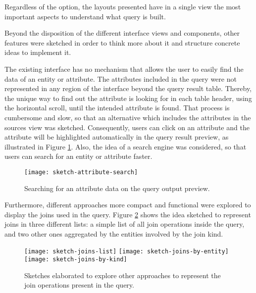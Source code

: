 Regardless of the option, the layouts presented have in a single view the most important aspects to understand what query is built.

Beyond the disposition of the different interface views and components, other features were sketched in order to think more about it and structure concrete ideas to implement it.

The existing interface has no mechanism that allows the user to easily find the data of an entity or attribute. The attributes included in the query were not represented in any region of the interface beyond the query result table. Thereby, the unique way to find out the attribute is looking for in each table header, using the horizontal scroll, until the intended attribute is found. That process is cumbersome and slow, so that an alternative which includes the attributes in the sources view was sketched. Consequently, users can click on an attribute and the attribute will be highlighted automatically in the query result preview, as illustrated in Figure \ref{fig:sketchAttributeSearch}. Also, the idea of a search engine was considered, so that users can search for an entity or attribute faster.

\begin{figure}[htbp]
	\centering
	\texttt{[image: sketch-attribute-search]}
	\caption{Searching for an attribute data on the query output preview.}
	\label{fig:sketchAttributeSearch}
\end{figure}

Furthermore, different approaches more compact and functional were explored to display the joins used in the query. Figure \ref{fig:sketchJoins} shows the idea sketched to represent joins in three different lists: a simple list of all join operations inside the query, and two other ones aggregated by the entities involved by the join kind.

\begin{figure}[tb]
  \centering
    {\texttt{[image: sketch-joins-list]}}%
  {\texttt{[image: sketch-joins-by-entity]}}%
  {\texttt{[image: sketch-joins-by-kind]}}%
\caption{Sketches elaborated to explore other approaches to represent the join operations present in the query.}
  \label{fig:sketchJoins}
\end{figure}

